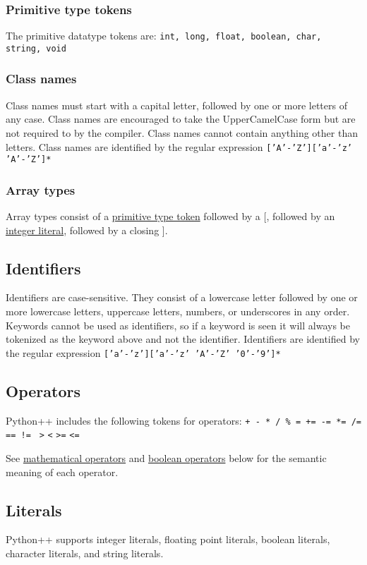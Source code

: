 \documentclass{article}
\begin{document}
\subsubsection{Primitive type tokens}
\label{sec:primitivetypetokens}
The primitive datatype tokens are: \texttt{int, long, float, boolean, char, string, void}

\subsubsection{Class names}
Class names must start with a capital letter, followed by one or more letters of any case. Class names are encouraged to take the UpperCamelCase form but are not required to by the compiler. Class names cannot contain anything other than letters. Class names are identified by the regular expression \texttt{['A'-'Z']['a'-'z' 'A'-'Z']*}

\subsubsection{Array types}
Array types consist of a \hyperref[sec:primitivetypetokens]{primitive type token} followed by a [, followed by an \hyperref[sec:intliterals]{integer literal}, followed by a closing ].

\subsection{Identifiers}
Identifiers are case-sensitive. They consist of a lowercase letter followed by one or more lowercase letters, uppercase letters, numbers, or underscores in any order. Keywords cannot be used as identifiers, so if a keyword is seen it will always be tokenized as the keyword above and not the identifier. Identifiers are identified by the regular expression \texttt{['a'-'z']['a'-'z' 'A'-'Z' '0'-'9']*}

\subsection{Operators}
Python++ includes the following tokens for operators: \texttt{+ - * / \% = += -= *= /= == != } \texttt{>} \texttt{<} \texttt{>=} \texttt{<=}

See \hyperref[sec:expr-mathematical-operators]{mathematical operators} and \hyperref[sec:expr-boolean-operators]{boolean operators} below for the semantic meaning of each operator.

\subsection{Literals}
Python++ supports integer literals, floating point literals, boolean literals, character literals, and string literals.
\end{document}
